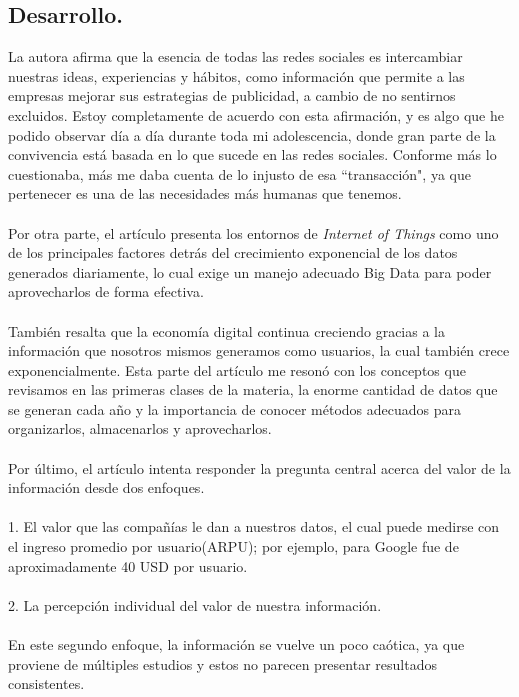 \subsection*{Desarrollo.}
La autora afirma que la esencia de todas las redes sociales es intercambiar nuestras ideas, experiencias y hábitos, como información que permite a las empresas mejorar sus estrategias de publicidad, a cambio de no sentirnos excluidos. Estoy completamente de acuerdo con esta afirmación, y es algo que he podido observar día a día durante toda mi adolescencia, donde gran parte de la convivencia está basada en lo que sucede en las redes sociales. Conforme más lo cuestionaba, más me daba cuenta de lo injusto de esa “transacción", ya que pertenecer es una de las necesidades más humanas que tenemos.\\ \\
Por otra parte, el artículo presenta los entornos de \textit{Internet of Things} como uno de los principales factores detrás del crecimiento exponencial de los datos generados diariamente, lo cual exige un manejo adecuado Big Data para poder aprovecharlos de forma efectiva. \\ \\
También resalta que la economía digital continua creciendo gracias a la información que nosotros mismos generamos como usuarios, la cual también crece exponencialmente. Esta parte del artículo me resonó con los conceptos que revisamos en las primeras clases de la materia, la enorme cantidad de datos que se generan cada año y la importancia de conocer métodos adecuados para organizarlos, almacenarlos y aprovecharlos. \\ \\
Por último, el artículo intenta responder la pregunta central acerca del valor de la información desde dos enfoques.\\ \\
1. El valor que las compañías le dan a nuestros datos, el cual puede medirse con el ingreso promedio por usuario(ARPU); por ejemplo, para Google fue de aproximadamente 40 USD por usuario.\\ \\
2. La percepción individual del valor de nuestra información.\\ \\
En este segundo enfoque, la información se vuelve un poco caótica, ya que proviene de múltiples estudios y estos no parecen presentar resultados consistentes. \\ \\
